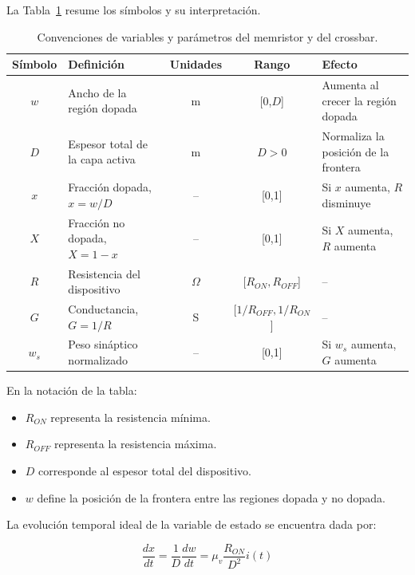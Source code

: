 La Tabla~\ref{tab:convenciones_memristor} resume los símbolos y su
interpretación.

\begin{table}[H]
\centering
\small
\caption{Convenciones de variables y parámetros del memristor y del crossbar.}
\label{tab:convenciones_memristor}
\begin{tabularx}{\textwidth}{c X c c X}
\hline
\textbf{Símbolo} & \textbf{Definición} & \textbf{Unidades} &
\textbf{Rango} & \textbf{Efecto} \\
\hline
$w$ & Ancho de la región dopada & m & [0,$D$] & Aumenta al crecer la región dopada \\
$D$ & Espesor total de la capa activa & m & $D>0$ & Normaliza la posición de la frontera \\
$x$ & Fracción dopada, $x=w/D$ & -- & [0,1] & Si $x$ aumenta, $R$ disminuye \\
$X$ & Fracción no dopada, $X=1-x$ & -- & [0,1] & Si $X$ aumenta, $R$ aumenta \\
$R$ & Resistencia del dispositivo & $\Omega$ & [$R_{ON},R_{OFF}$] & -- \\
$G$ & Conductancia, $G=1/R$ & S & [$1/R_{OFF},1/R_{ON}$] & -- \\
$w_s$ & Peso sináptico normalizado & -- & [0,1] & Si $w_s$ aumenta, $G$ aumenta \\
\hline
\end{tabularx}
\end{table}

En la notación de la tabla:

\begin{itemize}
\item $R_{ON}$ representa la resistencia mínima.
\item $R_{OFF}$ representa la resistencia máxima.
\item $D$ corresponde al espesor total del dispositivo.
\item $w$ define la posición de la frontera entre las regiones dopada y no dopada.
\end{itemize}

La evolución temporal ideal de la variable de estado se encuentra
dada por:

\begin{equation}
\frac{dx}{dt}=\frac{1}{D}\frac{dw}{dt}
=\mu_v\frac{R_{ON}}{D^2}i(t)
\end{equation}

